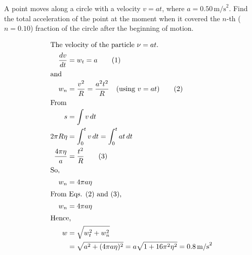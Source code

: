
\item A point moves along a circle with a velocity \( v = at \), where \( a = 0.50 \, \text{m/s}^2 \). Find the total acceleration of the point at the moment when it covered the \( n \)-th (\( n = 0.10 \)) fraction of the circle after the beginning of motion.
\begin{solution}
    \begin{align*}
        \intertext{The velocity of the particle \(\nu = at\).}
        \dfrac{dv}{dt} &= w_{t} = a \tag{1} \\
        \intertext{and}
        w_{n} &= \dfrac{v^2}{R} = \dfrac{a^2 t^2}{R} \quad \text{(using \(v = at\))} \tag{2} \\
        \intertext{From}
        s &= \int v\, dt \\
        2 \pi R \eta &= \int_{0}^{t} v\, dt = \int_{0}^{t} at\, dt \\
        \dfrac{4 \pi \eta}{a} &= \dfrac{t^2}{R} \tag{3} \\
        \intertext{So,}
        w_{n} &= 4 \pi a \eta \\
        \intertext{From Eqs. (2) and (3),}
        w_{n} &= 4 \pi a \eta \\
        \intertext{Hence,}
        w &= \sqrt{w_{t}^2 + w_{n}^2} \\
        &= \sqrt{a^2 + (4 \pi a \eta)^2} = a \sqrt{1 + 16 \pi^2 \eta^2} = 0.8 \,\text{m/s}^2
    \end{align*}
\end{solution}